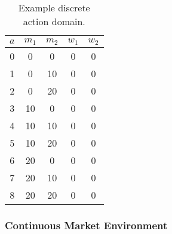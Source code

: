 \begin{table}
\begin{center}
\begin{tabular}{c|c|c|c|c}
\hline
$a$ &$m_1$ &$m_2$ &$w_1$ &$w_2$ \\
\hline
 0 &0 &0 &0 &0 \\
 1 &0 &10 &0 &0 \\
 2 &0 &20 &0 &0 \\
 3 &10 &0 &0 &0 \\
 4 &10 &10 &0 &0 \\
 5 &10 &20 &0 &0 \\
 6 &20 &0 &0 &0 \\
 7 &20 &10 &0 &0 \\
 8 &20 &20 &0 &0 \\
\hline
\end{tabular}
\caption{Example discrete action domain.}
\label{tbl:example_actions}
\end{center}
\end{table}

\subsubsection{Continuous Market Environment}

